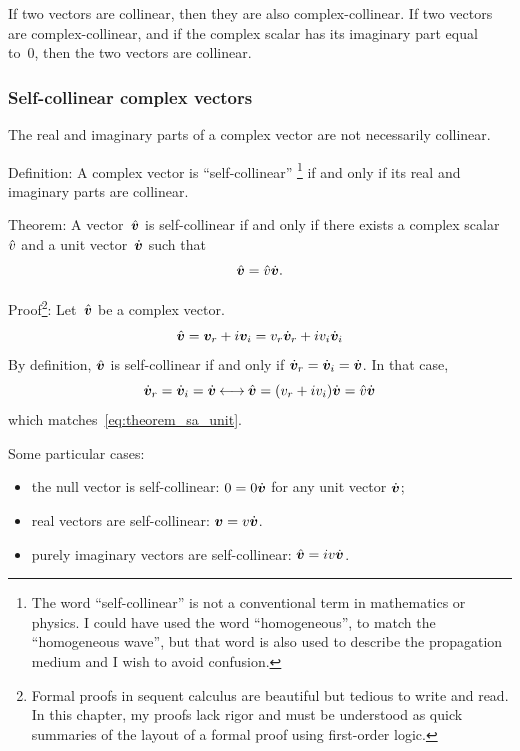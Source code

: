 If two vectors are collinear, then they are also complex-collinear.
If two vectors are complex-collinear, and if the complex scalar has its imaginary part equal to~0, then the two vectors are collinear.

\subsubsection{Self-collinear complex vectors}
The real and imaginary parts of a complex vector are not necessarily collinear.

Definition:
A complex vector is ``self-collinear''%
\footnote{
    The word ``self-collinear'' is not a conventional term in mathematics or physics.
    I could have used the word ``homogeneous'', to match the ``homogeneous wave'', but that word is also used to describe the propagation medium and I wish to avoid confusion.
}
if and only if its real and imaginary parts are collinear.

Theorem:
A vector~$\hat{\bm{v}}$ is self-collinear if and only if there exists a complex scalar~$\hat{v}$ and a unit vector~$\dot{\bm{v}}$ such that
\begin{equation}
    \hat{\bm{v}} = \hat{v} \dot{\bm{v}}
    \text{.}
    \label{eq:theorem_sa_unit}
\end{equation}

Proof\footnote{Formal proofs in sequent calculus are beautiful but tedious to write and read.  In this chapter, my proofs lack rigor and must be understood as quick summaries of the layout of a formal proof using first-order logic.}: Let~$\hat{\bm{v}}$ be a complex vector.
    \begin{equation}
        \hat{\bm{v}}
        =
        \bm{v}_r + i \bm{v}_i
        =
        v_r \dot{\bm{v}}_r + i v_i \dot{\bm{v}}_i
    \end{equation}
    By definition, $\hat{\bm{v}}$ is self-collinear if and only if $\dot{\bm{v}}_r = \dot{\bm{v}}_i = \dot{\bm{v}}$.
    In that case,
    \begin{equation}
        \dot{\bm{v}}_r = \dot{\bm{v}}_i = \dot{\bm{v}}
        \mathbin{\longleftrightarrow}
        \hat{\bm{v}} = (v_r + i v_i) \dot{\bm{v}} = \hat{v} \dot{\bm{v}}
    \end{equation}
    which matches~\cref{eq:theorem_sa_unit}.


Some particular cases:
\begin{itemize}
    \item the null vector is self-collinear: $0 = 0 \dot{\bm{v}}$ for any unit vector $\dot{\bm{v}}$;
    \item real vectors are self-collinear: $\bm{v} = v \dot{\bm{v}}$.
    \item purely imaginary vectors are self-collinear: $\hat{\bm{v}} = iv \dot{\bm{v}}$.
\end{itemize}





